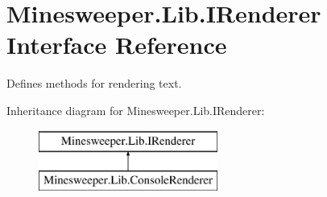 \hypertarget{interface_minesweeper_1_1_lib_1_1_i_renderer}{\section{Minesweeper.\+Lib.\+I\+Renderer Interface Reference}
\label{interface_minesweeper_1_1_lib_1_1_i_renderer}
}


Defines methods for rendering text.  


Inheritance diagram for Minesweeper.\+Lib.\+I\+Renderer\+:\begin{figure}[H]
\begin{center}
\leavevmode
\includegraphics[height=2.000000cm]{interface_minesweeper_1_1_lib_1_1_i_renderer}
\end{center}
\end{figure}
